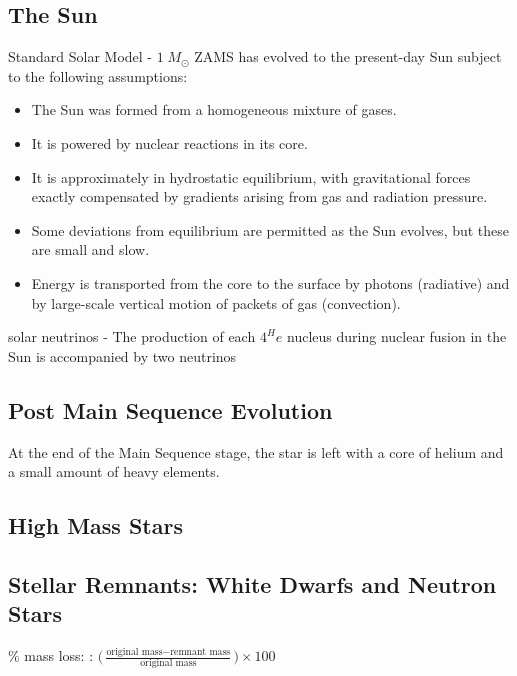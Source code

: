 \documentclass[a4paper, 11pt, landscape]{article}
\begin{document}
\begin{multicols*}{3}
\subsection{The Sun}
\begin{compactenum}
	\item Standard Solar Model - $1 \; M_{\odot}$ ZAMS has evolved to the present-day Sun subject to the following assumptions:
	\begin{itemize}
        \item The Sun was formed from a homogeneous mixture of gases.
        \item It is powered by nuclear reactions in its core.
        \item It is approximately in hydrostatic equilibrium, with gravitational forces exactly compensated by gradients arising from gas and radiation pressure.
        \item Some deviations from equilibrium are permitted as the Sun evolves, but these are small and slow.
        \item Energy is transported from the core to the surface by photons (radiative) and by large-scale vertical motion of packets of gas (convection).
    \end{itemize}
	\item solar neutrinos - The production of each ${4}^He$ nucleus during nuclear fusion in the Sun is accompanied by two neutrinos
\end{compactenum}

\subsection{Post Main Sequence Evolution}
At the end of the Main Sequence stage, the star is left with a core of helium and a small amount of heavy elements.
\begin{compactenum}
	\item 
\end{compactenum}

\subsection{High Mass Stars}
\begin{compactenum}
	\item 
\end{compactenum}

\subsection{Stellar Remnants: White Dwarfs and Neutron Stars}
\begin{compactenum}
	\item [\color{red}\% mass loss:]: $\Big( \frac{\text{original mass} - \text{remnant mass}}{\text{original mass}} \Big) \times 100$
\end{compactenum}


\end{multicols*}
\end{document}
